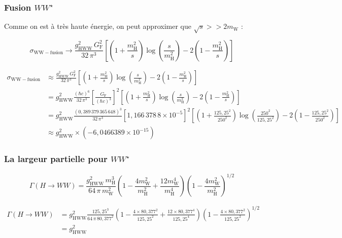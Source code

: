\documentclass[10pt,a4paper]{report}
\newcommand{\Wstar}{W^{\star}}
\newcommand{\mH}{m_\mathrm{H}}
\newcommand{\mW}{m_\mathrm{W}}
\newcommand{\vmH}{125,25}
\newcommand{\vmW}{80,377}
\newcommand{\vs}{250}
\newcommand{\vGF}{1,166\,378\,8 \times 10^{-5}}
\newcommand{\vhc}{0,389\,379\,365\,648} %
\newcommand{\GF}{G_\mathrm{F}}
\newcommand{\gHWW}{g_\mathrm{HWW}}
\begin{document}

\subsubsection{Fusion $W\Wstar$ \cite{desy}}

Comme on est à très haute énergie, on peut approximer que $ \sqrt{s} >> 2 \mW $ :

\begin{equation}
	\sigma_\mathrm{WW-fusion} \longrightarrow 
		\frac{\gHWW^2 \, \GF^2}{32 \, \pi^3}
		\left[
			\left(1 + \frac{\mH^2}{s}\right) \log\left(\frac{s}{\mH^2}\right)
			- 2 \left(1 - \frac{\mH^2}{s}\right)
		\right]
\end{equation}


\begin{align*}
	\sigma_\mathrm{WW-fusion}
		&\approx\frac{\gHWW^2 \, \GF^2}{32 \, \pi^3}
		\left[
			\left(1 + \frac{\mH^2}{s}\right) \log\left(\frac{s}{\mH^2}\right)
			- 2 \left(1 - \frac{\mH^2}{s}\right)
		\right]\\
		&=\gHWW^2\frac{(\hbar c)^6}{32 \, \pi^3}
		\left[\frac{\GF}{(\hbar c)^3}\right]^2
		\left[
			\left(1 + \frac{\mH^2}{s}\right) \log\left(\frac{s}{\mH^2}\right)
			- 2 \left(1 - \frac{\mH^2}{s}\right)
		\right]\\
		&=\gHWW^2\frac{(\vhc)^3}{32 \, \pi^3}
		\left[\vGF\right]^2
		\left[
			\left(1 + \frac{\vmH^2}{\vs^2}\right) \log\left(\frac{\vs^2}{\vmH^2}\right)
			- 2 \left(1 - \frac{\vmH^2}{\vs^2}\right)
		\right]\\
		&\approx \gHWW^2 \times (-6,0466389\times 10^{-15})
\end{align*}


\subsubsection{La largeur partielle pour $W\Wstar$ \cite{desy}}

\begin{equation}
	\Gamma\left(H\longrightarrow WW\right) = 
		\frac{\gHWW^2 \, \mH^3}{64 \, \pi \, \mW^2}
		\left(1 - \frac{4 \mW^2}{\mH^2} + \frac{12 \mW^4}{\mH^4}\right)
		\left(1 - \frac{4 \mW^2}{\mH^2}\right)^{1/2}
\end{equation}

\begin{align*}
	\Gamma\left(H\longrightarrow WW\right) 
	&= \gHWW^2
		\frac{\vmH^3}{64 \, \pi \, \vmW^2}
		\left(1 - \frac{4\times \vmW^2}{\vmH^2} + \frac{12\times \vmW^4}{\vmH^4}\right)
		\left(1 - \frac{4\times \vmW^2}{\vmH^2}\right)^{1/2}\\
	&= \gHWW^2 
\end{align*}
\end{document}
